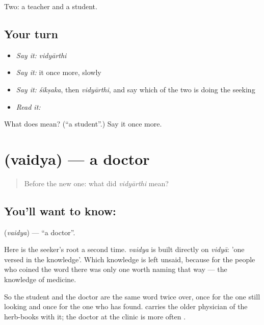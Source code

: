 \begin{grammarlens}[title={What you've built}]
Two: a teacher and a student.
\end{grammarlens}

\subsection*{Your turn}
\begin{itemize}
\raggedright
  \item \emph{Say it:} \emph{vidyārthi}
  \item \emph{Say it:} it once more, slowly
  \item \emph{Say it:} \emph{śikṣaka}, then \emph{vidyārthi}, and say which of the two is doing the seeking
  \item \emph{Read it:} \textbf{}
\end{itemize}

\begin{tcolorbox}[breakable,colback=teal!4,colframe=teal!35!black,title={Before you move on}]
What does  mean? (\textquotedblleft{}a student\textquotedblright{}.) Say it once more.
\end{tcolorbox}
\section[\texorpdfstring{\kn{ವೈದ್ಯ} (vaidya)}{ವೈದ್ಯ (vaidya)}]{ (vaidya) — a doctor}

\label{lesson:KA-C48-doctor}



\begin{quote}
Before the new one: what did \emph{vidyārthi} mean?
\end{quote}

\subsection*{You'll want to know: }
\textbf{} (\emph{vaidya}) — \textquotedblleft{}a doctor\textquotedblright{}.

Here is the seeker's root a second time. \emph{vaidya} is built directly on \emph{vidyā}: 'one versed in the knowledge'. Which knowledge is left unsaid, because for the people who coined the word there was only one worth naming that way — the knowledge of medicine.

So the student and the doctor are the same word twice over, once for the one still looking and once for the one who has found.  carries the older physician of the herb-books with it; the doctor at the clinic is more often .

